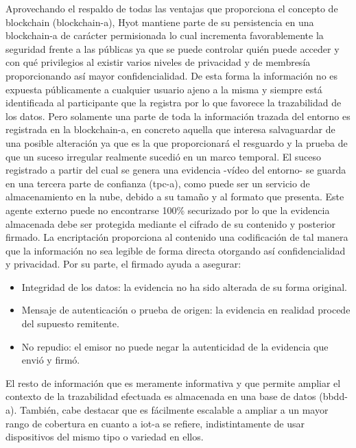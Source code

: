 \documentclass[12pt,a4paper, twoside]{report}
\begin{document}
	Aprovechando el respaldo de todas las ventajas que proporciona el concepto de \Gls{blockchain} (\gls{blockchain-a}), Hyot mantiene parte de su persistencia en una \gls{blockchain-a} de carácter permisionada lo cual incrementa favorablemente la seguridad frente a las públicas ya que se puede controlar quién puede acceder y con qué privilegios al existir varios niveles de privacidad y de membresía proporcionando así mayor confidencialidad. De esta forma la información no es expuesta públicamente a cualquier usuario ajeno a la misma y siempre está identificada al participante que la registra por lo que favorece la trazabilidad de los datos. Pero solamente una parte de toda la información trazada del entorno es registrada en la \gls{blockchain-a}, en concreto aquella que interesa salvaguardar de una posible alteración ya que es la que proporcionará el resguardo y la prueba de que un suceso irregular realmente sucedió en un marco temporal. El suceso registrado a partir del cual se genera una evidencia -vídeo del entorno- se guarda en una tercera parte de confianza (\gls{tpc-a}), como puede ser un servicio de almacenamiento en la nube, debido a su tamaño y al formato que presenta. Este agente externo puede no encontrarse 100\% securizado por lo que la evidencia almacenada debe ser protegida mediante el cifrado de su contenido y posterior firmado. La encriptación proporciona al contenido una codificación de tal manera que la información no sea legible de forma directa otorgando así confidencialidad y privacidad. Por su parte, el firmado ayuda a asegurar:
		
	\begin{itemize}
		\item Integridad de los datos: la evidencia no ha sido alterada de su forma original.
		\item Mensaje de autenticación o prueba de origen: la evidencia en realidad procede del supuesto remitente.
		\item No repudio: el emisor no puede negar la autenticidad de la evidencia que envió y firmó.
	\end{itemize}
		
	El resto de información que es meramente informativa y que permite ampliar el contexto de la trazabilidad efectuada es almacenada en una base de datos (\gls{bbdd-a}). También, cabe destacar que es fácilmente escalable a ampliar a un mayor rango de cobertura en cuanto a \gls{iot-a} se refiere, indistintamente de usar dispositivos del mismo tipo o variedad en ellos. \\
	
\end{document}

